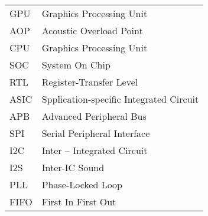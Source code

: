 \begin{tabular}{ l l }
\hspace{1cm} GPU & \hspace{4cm} Graphics Processing Unit  \\ 
\hspace{1cm} AOP  & \hspace{4cm} Acoustic Overload Point  \\ 
\hspace{1cm} CPU & \hspace{4cm} Graphics Processing Unit  \\
\hspace{1cm} SOC & \hspace{4cm} System On Chip  \\ 
\hspace{1cm} RTL & \hspace{4cm} Register-Transfer Level  \\ 
\hspace{1cm} ASIC & \hspace{4cm} Spplication-specific Integrated Circuit \\ 
\hspace{1cm} APB & \hspace{4cm} Advanced Peripheral Bus \\ 
\hspace{1cm} SPI & \hspace{4cm} Serial Peripheral Interface \\ 
\hspace{1cm} I2C & \hspace{4cm}  Inter – Integrated Circuit \\ 
\hspace{1cm} I2S & \hspace{4cm}  Inter-IC Sound \\ 
\hspace{1cm} PLL & \hspace{4cm}  Phase-Locked Loop \\ 
\hspace{1cm} FIFO & \hspace{4cm}  First In First Out \\ 

\end{tabular}  

\newpage